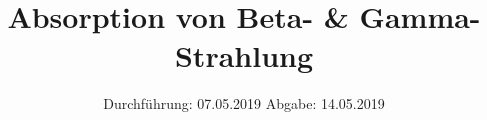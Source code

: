 

\subject{V704}
\title{Absorption von Beta- \& Gamma-Strahlung}
\date{
  Durchführung: 07.05.2019
  \hspace{3em}
  Abgabe: 14.05.2019
}


\maketitle
\thispagestyle{empty}
\tableofcontents
\newpage




%




\printbibliography

